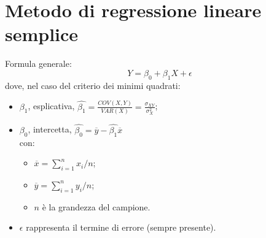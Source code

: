 \section{Metodo di regressione lineare semplice}
Formula generale:
\[ Y = \beta_0 + \beta_1 X + \epsilon \]
dove, nel caso del criterio dei minimi quadrati:
\begin{itemize}
 \item $\beta_1$, esplicativa, $\hat{\beta_1} = 
\frac{COV(X,Y)}{VAR(X)} = \frac{\sigma_{XY}}{\sigma^2_{X}}$;
 \item $\beta_0$, intercetta, $\hat{\beta_0} = \overline{y} - \hat{\beta_1} 
\overline{x}$ \\
  con:
  \begin{itemize}
   \item $\overline{x} = \sum_{i=1}^n x_i/n $;
   \item $\overline{y} = \sum_{i=1}^n y_i/n $;
   \item $n$ \`e la grandezza del campione.
  \end{itemize}

 \item $\epsilon$ rappresenta il termine di errore (sempre presente).
\end{itemize}

